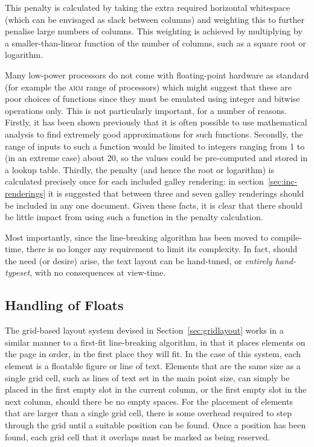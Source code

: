 This penalty is calculated by taking the extra required horizontal whitespace (which can be envisaged as slack between columns) and weighting this to further penalise large numbers of columns. This weighting is achieved by multiplying by a smaller-than-linear function of the number of columns, such as a square root or logarithm.

Many low-power processors do not come with floating-point hardware as standard (for example the \textsc{arm} range of processors) which might suggest that these are poor choices of functions since they must be emulated using integer and bitwise operations only. This is not particularly important, for a number of reasons. Firstly, it has been shown previously\hspace{0pt}\cite{Lomont2003} that it is often possible to use mathematical analysis to find extremely good approximations for such functions. Secondly, the range of inputs to such a function would be limited to integers ranging from 1 to (in an extreme case) about 20, so the values could be pre-computed and stored in a lookup table. Thirdly, the penalty (and hence the root or logarithm) is calculated precisely once for each included galley rendering: in section~\ref{sec:inc-renderings} it is suggested that between three and seven galley renderings should be included in any one document. Given these facts, it is clear that there should be little impact from using such a function in the penalty calculation.

\vspace{2em}

Most importantly, since the line-breaking algorithm has been moved to compile-time, there is no longer any requirement to limit its complexity. In fact, should the need (or desire) arise, the text layout can be hand-tuned, or \emph{entirely hand-typeset}, with no consequences at view-time.


\subsection{Handling of Floats}

The grid-based layout system devised in Section~\ref{sec:gridlayout} works in a similar manner to a first-fit line-breaking algorithm, in that it places elements on the page in order, in the first place they will fit. In the case of this system, each element is a floatable figure or line of text. Elements that are the same size as a single grid cell, such as lines of text set in the main point size, can simply be placed in the first empty slot in the current column, or the first empty slot in the next column, should there be no empty spaces.  For the placement of elements that are larger than a single grid cell, there is some overhead required to step through the grid until a suitable position can be found. Once a position has been found, each grid cell that it overlaps must be marked as being reserved.

